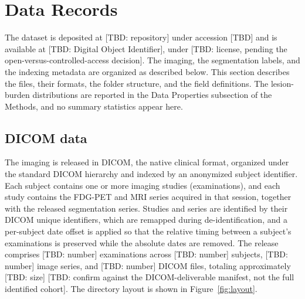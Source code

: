 
\section*{Data Records}\label{sec:datarecords}

The dataset is deposited at [TBD: repository] under accession [TBD] and is available at [TBD: Digital Object Identifier], under [TBD: license, pending the open-versus-controlled-access decision].
The imaging, the segmentation labels, and the indexing metadata are organized as described below.
This section describes the files, their formats, the folder structure, and the field definitions.
The lesion-burden distributions are reported in the Data Properties subsection of the Methods, and no summary statistics appear here.

\subsection*{DICOM data}\label{subsec:dicom}
The imaging is released in DICOM, the native clinical format, organized under the standard DICOM hierarchy and indexed by an anonymized subject identifier.
Each subject contains one or more imaging studies (examinations), and each study contains the FDG-PET and MRI series acquired in that session, together with the released segmentation series.
Studies and series are identified by their DICOM unique identifiers, which are remapped during de-identification, and a per-subject date offset is applied so that the relative timing between a subject's examinations is preserved while the absolute dates are removed.
The release comprises [TBD: number] examinations across [TBD: number] subjects, [TBD: number] image series, and [TBD: number] DICOM files, totaling approximately [TBD: size] [TBD: confirm against the DICOM-deliverable manifest, not the full identified cohort].
The directory layout is shown in Figure~\ref{fig:layout}.

